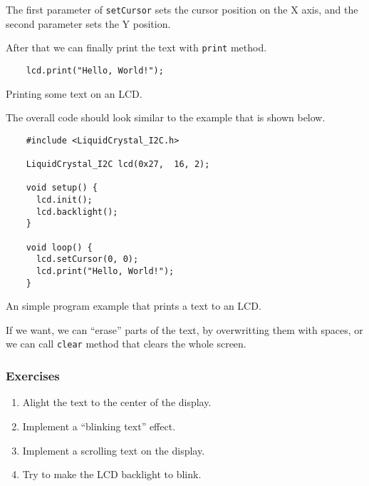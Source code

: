 \documentclass[../sparc.tex]{subfiles}
\begin{document}
The first parameter of \texttt{setCursor} sets the cursor position on
the X axis, and the second parameter sets the Y position.

After that we can finally print the text with \texttt{print} method.

\begin{listing}[ht]
  \begin{verbatim}
    lcd.print("Hello, World!");
  \end{verbatim}
  \caption{Printing some text on an LCD.}
  \label{listing:game-dev-lcd-print}
\end{listing}

The overall code should look similar to the example that is shown below.

\begin{listing}[H]
  \begin{verbatim}
    #include <LiquidCrystal_I2C.h>

    LiquidCrystal_I2C lcd(0x27,  16, 2);

    void setup() {
      lcd.init();
      lcd.backlight();
    }

    void loop() {
      lcd.setCursor(0, 0);
      lcd.print("Hello, World!");
    }
  \end{verbatim}
  \caption{An simple program example that prints a text to an LCD.}
  \label{listing:game-dev-lcd-example-00}
\end{listing}

If we want, we can ``erase'' parts of the text, by overwritting them with
spaces, or we can call \texttt{clear} method that clears the whole
screen.

\subsubsection{Exercises}

\begin{enumerate}
\item Alight the text to the center of the display.
\item Implement a ``blinking text'' effect.
\item Implement a scrolling text on the display.
\item Try to make the LCD backlight to blink.
\end{enumerate}
\end{document}
